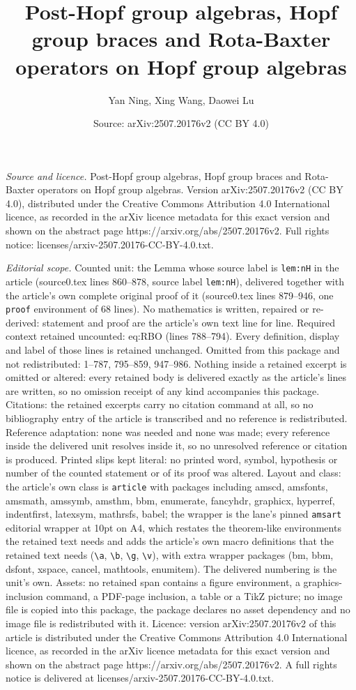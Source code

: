 \documentclass[10pt,a4paper]{amsart}
\title[Post-Hopf group algebras, Hopf group braces and Rota-Baxter ]{Post-Hopf group algebras, Hopf group braces and Rota-Baxter operators on Hopf group algebras}
\author{Yan Ning, Xing Wang, Daowei Lu}
\date{Source: arXiv:2507.20176v2 (CC BY 4.0)}
\begin{document}
\maketitle

\noindent\emph{Source and licence.} Post-Hopf group algebras, Hopf group braces and Rota-Baxter operators on Hopf group algebras. Version arXiv:2507.20176v2 (CC BY 4.0), distributed under the Creative Commons Attribution 4.0 International licence, as recorded in the arXiv licence metadata for this exact version and shown on the abstract page https://arxiv.org/abs/2507.20176v2. Full rights notice: licenses/arxiv-2507.20176-CC-BY-4.0.txt.\par\smallskip

\noindent\textit{Editorial scope.} Counted unit: the Lemma whose source label is \texttt{lem:nH} in the article (source0.tex lines 860--878, source label \texttt{lem:nH}), delivered together with the article's own complete original proof of it (source0.tex lines 879--946, one \texttt{proof} environment of 68 lines). No mathematics is written, repaired or re-derived: statement and proof are the article's own text line for line. Required context retained uncounted: eq:RBO (lines 788--794). Every definition, display and label of those lines is retained unchanged. Omitted from this package and not redistributed: 1--787, 795--859, 947--986. Nothing inside a retained excerpt is omitted or altered: every retained body is delivered exactly as the article's lines are written, so no omission receipt of any kind accompanies this package. Citations: the retained excerpts carry no citation command at all, so no bibliography entry of the article is transcribed and no reference is redistributed. Reference adaptation: none was needed and none was made; every reference inside the delivered unit resolves inside it, so no unresolved reference or citation is produced. Printed slips kept literal: no printed word, symbol, hypothesis or number of the counted statement or of its proof was altered. Layout and class: the article's own class is \texttt{article} with packages including amscd, amsfonts, amsmath, amssymb, amsthm, bbm, enumerate, fancyhdr, graphicx, hyperref, indentfirst, latexsym, mathrsfs, babel; the wrapper is the lane's pinned \texttt{amsart} editorial wrapper at 10pt on A4, which restates the theorem-like environments the retained text needs and adds the article's own macro definitions that the retained text needs (\texttt{\textbackslash a}, \texttt{\textbackslash b}, \texttt{\textbackslash g}, \texttt{\textbackslash v}), with extra wrapper packages (bm, bbm, dsfont, xspace, cancel, mathtools, enumitem). The delivered numbering is the unit's own. Assets: no retained span contains a figure environment, a graphics-inclusion command, a PDF-page inclusion, a table or a TikZ picture; no image file is copied into this package, the package declares no asset dependency and no image file is redistributed with it. Licence: version arXiv:2507.20176v2 of this article is distributed under the Creative Commons Attribution 4.0 International licence, as recorded in the arXiv licence metadata for this exact version and shown on the abstract page https://arxiv.org/abs/2507.20176v2. A full rights notice is delivered at licenses/arxiv-2507.20176-CC-BY-4.0.txt. 
\end{document}
